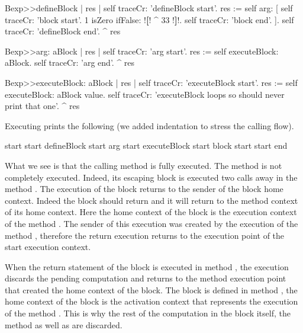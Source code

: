 \documentclass[a4paper,10pt,twoside]{book}
\begin{document}
\begin{code}{}
Bexp>>defineBlock
	| res |
	self traceCr: 'defineBlock start'.
	res := self arg: [ self traceCr: 'block start'. 
                            1 isZero ifFalse: !\textbf{[}! ^ 33 !\textbf{]}!.
                            self traceCr: 'block end'. ].
	self traceCr: 'defineBlock end'.
	^ res
\end{code}

\begin{code}{}
Bexp>>arg: aBlock
	| res |
	self traceCr: 'arg start'. 
	res := self executeBlock: aBlock.
	self traceCr: 'arg end'. 
	^ res 
\end{code}

\begin{code}{}
Bexp>>executeBlock: aBlock
	| res |
	self traceCr: 'executeBlock start'.
	res := self executeBlock: aBlock value. 
	self traceCr: 'executeBlock loops so should never print that one'.
	^  res
\end{code}


Executing   prints the following (we added indentation to stress the calling flow).

\begin{code}{}
start start
   defineBlock start
      arg start
         executeBlock start
            block start
start end
\end{code}

What we see is that the calling method  is fully executed. The method  is not completely executed. Indeed, its escaping block \ct{[^33]} is executed two calls away in the method . The execution of the block returns to the sender of the block home context. 
Indeed the block should return and it will return to the method context of its home context. Here the home context of the block is the execution context of the method . The sender of this execution was created by the execution of the method , therefore the return execution returns to the execution point of the start execution context.

When the return statement of the block is executed in method , the execution discards the pending computation and returns to the method execution point that created the home context of the block. The block is defined in  method , the home context of the block is the activation context that represents the execution of the method . This is why the rest of the computation in the block itself, the  method as well as  are discarded. 
\end{document}
